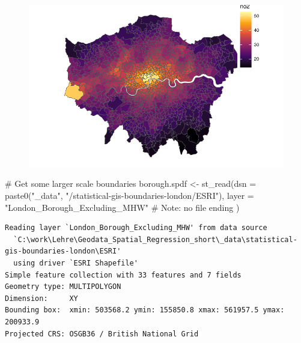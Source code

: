 \documentclass[
  letterpaper,
  DIV=11,
  numbers=noendperiod]{scrreprt}
\newenvironment{Shaded}{\begin{snugshade}}{\end{snugshade}}
\newcommand{\AttributeTok}[1]{\textcolor[rgb]{0.40,0.45,0.13}{#1}}
\newcommand{\CommentTok}[1]{\textcolor[rgb]{0.37,0.37,0.37}{#1}}
\newcommand{\FunctionTok}[1]{\textcolor[rgb]{0.28,0.35,0.67}{#1}}
\newcommand{\NormalTok}[1]{\textcolor[rgb]{0.00,0.23,0.31}{#1}}
\newcommand{\OtherTok}[1]{\textcolor[rgb]{0.00,0.23,0.31}{#1}}
\newcommand{\StringTok}[1]{\textcolor[rgb]{0.13,0.47,0.30}{#1}}
\begin{document}
\begin{figure}[H]

{\centering \includegraphics{01_refresher_short_files/figure-pdf/unnamed-chunk-35-1.pdf}

}

\end{figure}

\begin{Shaded}
\begin{Highlighting}[]
\CommentTok{\# Get some larger scale boundaries}
\NormalTok{borough.spdf }\OtherTok{\textless{}{-}} \FunctionTok{st\_read}\NormalTok{(}\AttributeTok{dsn =} \FunctionTok{paste0}\NormalTok{(}\StringTok{"\_data"}\NormalTok{, }\StringTok{"/statistical{-}gis{-}boundaries{-}london/ESRI"}\NormalTok{),}
                     \AttributeTok{layer =} \StringTok{"London\_Borough\_Excluding\_MHW"} \CommentTok{\# Note: no file ending}
\NormalTok{                     )}
\end{Highlighting}
\end{Shaded}

\begin{verbatim}
Reading layer `London_Borough_Excluding_MHW' from data source 
  `C:\work\Lehre\Geodata_Spatial_Regression_short\_data\statistical-gis-boundaries-london\ESRI' 
  using driver `ESRI Shapefile'
Simple feature collection with 33 features and 7 fields
Geometry type: MULTIPOLYGON
Dimension:     XY
Bounding box:  xmin: 503568.2 ymin: 155850.8 xmax: 561957.5 ymax: 200933.9
Projected CRS: OSGB36 / British National Grid
\end{verbatim}
\end{document}
